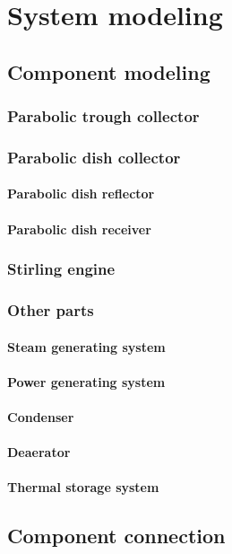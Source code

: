 \chapter{System modeling}
\section{Component modeling}
\subsection{Parabolic trough collector}
\subsection{Parabolic dish collector}
\subsubsection{Parabolic dish reflector}
\subsubsection{Parabolic dish receiver}
\subsection{Stirling engine}
\subsection{Other parts}
\subsubsection{Steam generating system}
\subsubsection{Power generating system}
\subsubsection{Condenser}
\subsubsection{Deaerator}
\subsubsection{Thermal storage system}
\section{Component connection}
